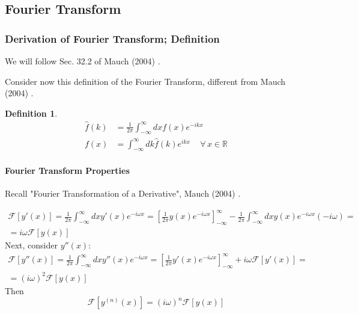 \documentclass[10pt]{amsart}
\newtheorem{definition}{Definition}
\begin{document}
\begin{multicols*}{2}
\part{Fourier Transform}

\section{Derivation of Fourier Transform; Definition}

We will follow Sec. 32.2 of Mauch (2004) \cite{Mauc2004}.

Consider now this definition of the Fourier Transform, different from Mauch (2004) \cite{Mauc2004}.

\begin{definition}
\begin{equation}
\begin{aligned}
\widehat{f}(k) &= \frac{1}{2\pi} \int_{-\infty}^{\infty} dx f(x) e^{-ikx} \\
f(x) & = \int_{-\infty}^{\infty} dk \widehat{f}(k) e^{ikx} \quad \, \forall \, x \in \mathbb{R}
\end{aligned}
\end{equation}
\end{definition}

\subsection{Fourier Transform Properties}

Recall "Fourier Transformation of a Derivative", Mauch (2004) \cite{Mauc2004}.

\[
\begin{gathered}
\mathcal{F}[y'(x)] = \frac{1}{2\pi} \int_{-\infty}^{\infty} dx y'(x) e^{-i\omega x } = \left[ \frac{1}{2\pi} y(x) e^{-i\omega x} \right]_{-\infty}^{\infty} - \frac{1}{2\pi} \int_{-\infty}^{\infty} dx y(x) e^{-i\omega x} (-i \omega) = \\
= i\omega \mathcal{F}[y(x)]
\end{gathered}
\]
Next, consider $y''(x)$:
\[
\begin{gathered}
\mathcal{F}[y''(x)] = \frac{1}{2\pi} \int_{-\infty}^{\infty} dx y''(x) e^{-i\omega x } = \left[ \frac{1}{2\pi} y'(x) e^{-i\omega x} \right]_{-\infty}^{\infty} + i \omega \mathcal{F}[y'(x)] = \\
= (i\omega)^2 \mathcal{F}[y(x)]
\end{gathered}
\]
Then 
\begin{equation}
\mathcal{F}[y^{(n)}(x) ] = (i\omega)^n \mathcal{F}[y(x)]
\end{equation}


\end{multicols*}
\end{document}
